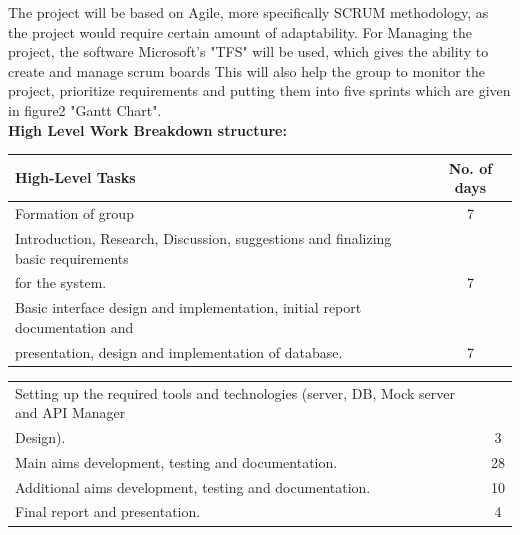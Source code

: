 \documentclass[12pt]{article}
\begin{document}
The project will be based on Agile, more specifically SCRUM methodology, as the project would require certain amount of adaptability. For Managing the project, the software Microsoft’s "TFS" will be used, which gives the ability to create and manage scrum boards This will also help the group to monitor the project,  prioritize requirements and putting them into five sprints which are given in figure2 "Gantt Chart". \\

\textbf{High Level Work Breakdown structure:}
\begin{table}[!ht] 
\centering
\label{tab:exTable2}
\smallskip
\begin{tabular}{l c }
\hline
High-Level Tasks & No. of days\\[0.5ex]
\hline
Formation of group & 7 \\[0.5ex]
\hline
Introduction, Research, Discussion, suggestions and finalizing basic requirements \\ for the system. & 7 \\[0.5ex]
\hline
Basic interface design and implementation, initial report documentation and \\ presentation, design and implementation of database. & 7 \\[0.5ex]
\end{tabular}
\end{table}

\begin{table}[!ht] 
\centering
\label{tab:exTable3}
\smallskip
\begin{tabular}{l c }
\hline
Setting up the required tools and technologies (server, DB, Mock server and API Manager \\ Design). & 3 \\[0.5ex]
\hline
Main aims development, testing and documentation. & 28 \\[0.5ex]
\hline
Additional aims development, testing and documentation. & 10 \\[0.5ex]
\hline
Final report and presentation. & 4 \\[0.5ex]
\end{tabular}
\end{table}
\end{document}
